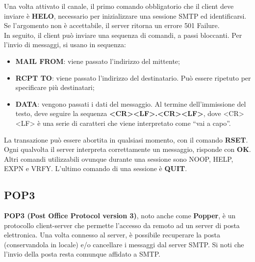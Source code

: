     Una volta attivato il canale, il primo comando obbligatorio che il client deve inviare è \textbf{HELO},
    necessario per inizializzare una sessione SMTP ed identificarsi. Se l’argomento non è
    accettabile, il server ritorna un errore 501 Failure.\\
    
    In seguito, il client può inviare una sequenza di comandi, a passi bloccanti. Per l’invio di
    messaggi, si usano in sequenza:
    \begin{itemize}
        \item \textbf{MAIL FROM}: viene passato l’indirizzo del mittente;
        \item \textbf{RCPT TO}: viene passato l’indirizzo del destinatario. Può essere ripetuto per specificare
        più destinatari;
        \item \textbf{DATA}: vengono passati i dati del messaggio. Al termine dell’immissione del testo, deve
        seguire la sequenza \textbf{<CR><LF>.<CR><LF>}, dove <CR><LF> è una serie di caratteri che
        viene interpretato come “vai a capo”.
    \end{itemize}
    
    La transazione può essere abortita in qualsiasi momento, con il comando \textbf{RSET}. Ogni qualvolta
    il server interpreta correttamente un messaggio, risponde con \textbf{OK}. Altri comandi utilizzabili
    ovunque durante una sessione sono NOOP, HELP, EXPN e VRFY. L’ultimo comando di una
    sessione è \textbf{QUIT}.
    
    \subsection{POP3}

    \textbf{POP3 (Post Office Protocol version 3)}, noto anche come \textbf{Popper}, è un protocollo client-server
    che permette l’accesso da remoto ad un server di posta elettronica. Una volta connesso al
    server, è possibile recuperare la posta (conservandola in locale) e/o cancellare i messaggi dal
    server SMTP. Si noti che l’invio della posta resta comunque affidato a SMTP.\\

